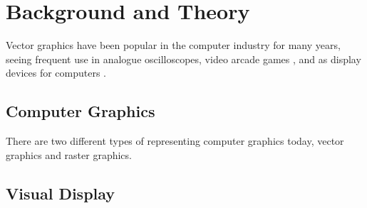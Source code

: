 \chapter{Background and Theory}

Vector graphics have been popular in the computer industry for many years,
seeing frequent use in analogue oscilloscopes, video arcade games \cite{astroids},
and as display devices for computers \cite{ibm2250}.

\section{Computer Graphics}
There are two different types of representing computer graphics today, vector graphics and raster graphics.




\section{Visual Display}




